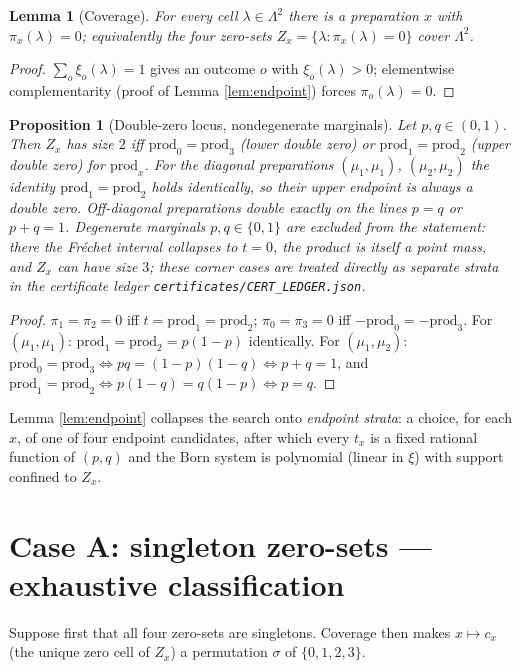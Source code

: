 \documentclass[11pt,a4paper]{article}
\newtheorem{lemma}{Lemma}
\newtheorem{proposition}{Proposition}
\begin{document}
\begin{lemma}[Coverage]
\label{lem:coverage}
For every cell $\lambda\in\Lambda^2$ there is a preparation $x$ with $\pi_x(\lambda)=0$; equivalently the four zero-sets $Z_x=\{\lambda:\pi_x(\lambda)=0\}$ cover $\Lambda^2$.
\end{lemma}
\begin{proof}
$\sum_o\xi_o(\lambda)=1$ gives an outcome $o$ with $\xi_o(\lambda)>0$; elementwise complementarity (proof of Lemma \ref{lem:endpoint}) forces $\pi_o(\lambda)=0$.
\end{proof}

\begin{proposition}[Double-zero locus, nondegenerate marginals]
\label{prop:double}
Let $p,q\in(0,1)$. Then $Z_x$ has size $2$ iff $\mathrm{prod}_0=\mathrm{prod}_3$ (lower double zero) or $\mathrm{prod}_1=\mathrm{prod}_2$ (upper double zero) for $\mathrm{prod}_x$. For the diagonal preparations $(\mu_1,\mu_1)$, $(\mu_2,\mu_2)$ the identity $\mathrm{prod}_1=\mathrm{prod}_2$ holds identically, so their upper endpoint is always a double zero. Off-diagonal preparations double exactly on the lines $p=q$ or $p+q=1$. Degenerate marginals $p,q\in\{0,1\}$ are excluded from the statement: there the Fr\'echet interval collapses to $t=0$, the product is itself a point mass, and $Z_x$ can have size $3$; these corner cases are treated directly as separate strata in the certificate ledger \texttt{certificates/CERT\_LEDGER.json}.
\end{proposition}
\begin{proof}
$\pi_1=\pi_2=0$ iff $t=\mathrm{prod}_1=\mathrm{prod}_2$; $\pi_0=\pi_3=0$ iff $-\mathrm{prod}_0=-\mathrm{prod}_3$. For $(\mu_1,\mu_1)$: $\mathrm{prod}_1=\mathrm{prod}_2=p(1-p)$ identically. For $(\mu_1,\mu_2)$: $\mathrm{prod}_0=\mathrm{prod}_3\iff p q=(1-p)(1-q)\iff p+q=1$, and $\mathrm{prod}_1=\mathrm{prod}_2\iff p(1-q)=q(1-p)\iff p=q$.
\end{proof}

Lemma \ref{lem:endpoint} collapses the search onto \emph{endpoint strata}: a choice, for each $x$, of one of four endpoint candidates, after which every $t_x$ is a fixed rational function of $(p,q)$ and the Born system is polynomial (linear in $\xi$) with support confined to $Z_x$.

\section{Case A: singleton zero-sets --- exhaustive classification}
\label{sec:caseA}
Suppose first that all four zero-sets are singletons. Coverage then makes $x\mapsto c_x$ (the unique zero cell of $Z_x$) a permutation $\sigma$ of $\{0,1,2,3\}$.
\end{document}
